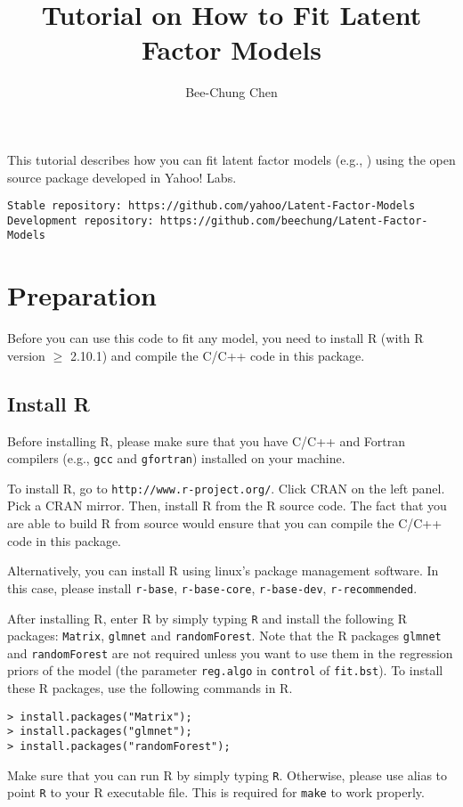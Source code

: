 \documentclass[10pt]{article}
\begin{document}
\title{Tutorial on How to Fit Latent Factor Models}
\author{Bee-Chung Chen}
\maketitle

This tutorial describes how you can fit latent factor models (e.g., \cite{rlfm:kdd09,bst:kdd11,gmf:recsys11}) using the open source package developed in Yahoo! Labs.

{\small\begin{verbatim}
Stable repository: https://github.com/yahoo/Latent-Factor-Models
Development repository: https://github.com/beechung/Latent-Factor-Models
\end{verbatim}}

\section{Preparation}

Before you can use this code to fit any model, you need to install R (with R version $\geq$ 2.10.1) and compile the C/C++ code in this package.

\subsection{Install R}

Before installing R, please make sure that you have C/C++ and Fortran compilers (e.g., {\tt gcc} and {\tt gfortran}) installed on your machine.

To install R, go to {\tt http://www.r-project.org/}.  Click CRAN on the left panel.  Pick a CRAN mirror.  Then, install R from the R source code.  The fact that you are able to build R from source would ensure that you can compile the C/C++ code in this package.

Alternatively, you can install R using linux's package management software.  In this case, please install {\tt r-base}, {\tt r-base-core}, {\tt r-base-dev}, {\tt r-recommended}.

After installing R, enter R by simply typing {\tt R} and install the following R packages: {\tt Matrix}, {\tt glmnet} and {\tt randomForest}. Note that the R packages {\tt glmnet} and {\tt randomForest} are not required unless you want to use them in the regression priors of the model (the parameter {\tt reg.algo} in {\tt control} of {\tt fit.bst}).  To install these R packages, use the following commands in R.
{\small\begin{verbatim}
> install.packages("Matrix");
> install.packages("glmnet");
> install.packages("randomForest");
\end{verbatim}}
\noindent Make sure that you can run R by simply typing {\tt R}.  Otherwise, please use alias to point {\tt R} to your R executable file.  This is required for {\tt make} to work properly.
\end{document}
